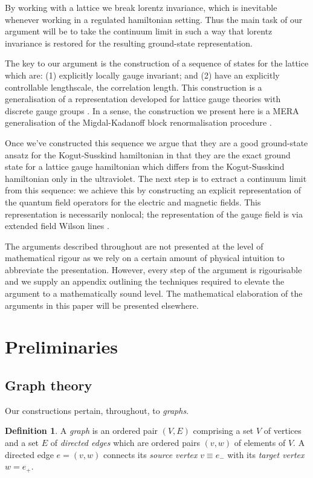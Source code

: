 \documentclass[12pt]{amsart}
\theoremstyle{definition}
\newtheorem{definition}[theorem]{Definition}
\theoremstyle{remark}
\numberwithin{equation}{section}
\begin{document}
By working with a lattice we break lorentz invariance, which is inevitable whenever working in a regulated hamiltonian setting. Thus the main task of our argument will be to take the continuum limit in such a way that lorentz invariance is restored for the resulting ground-state representation.
 
The key to our argument is the construction of a sequence of states for the lattice which are: (1) explicitly locally gauge invariant; and (2) have an explicitly controllable lengthscale, the correlation length. This construction is a generalisation of a representation developed for lattice gauge theories with discrete gauge groups \cite{aguado:2008a}. In a sense, the construction we present here is a MERA generalisation of the Migdal-Kadanoff block renormalisation procedure \cite{migdal:1975a, migdal:1975b, kadanoff:1976a, kadanoff:1977a}. 


Once we've constructed this sequence we argue that they are a good ground-state ansatz for the Kogut-Susskind hamiltonian in that they are the exact ground state for a lattice gauge hamiltonian which differs from the Kogut-Susskind hamiltonian only in the ultraviolet. The next step is to extract a continuum limit from this sequence: we achieve this by constructing an explicit representation of the quantum field operators for the electric and magnetic fields. This representation is necessarily nonlocal; the representation of the gauge field is via extended field Wilson lines \cite{summers:2012a}.

The arguments described throughout are not presented at the level of mathematical rigour as we rely on a certain amount of physical intuition to abbreviate the presentation. However, every step of the argument is rigourisable and we supply an appendix outlining the techniques required to elevate the argument to a mathematically sound level. The mathematical elaboration of the arguments in this paper will be presented elsewhere. 

\section{Preliminaries}

\subsection{Graph theory}
Our constructions pertain, throughout, to \emph{graphs}.
\begin{definition}
A \emph{graph} is an ordered pair $(V, E)$ comprising a set $V$ of vertices and a set $E$ of \emph{directed edges} which are ordered pairs $(v,w)$ of elements of $V$. A directed edge $e = (v,w)$ connects its \emph{source vertex} $v \equiv e_-$ with its \emph{target vertex} $w = e_+$. 
\end{definition}
\end{document}
